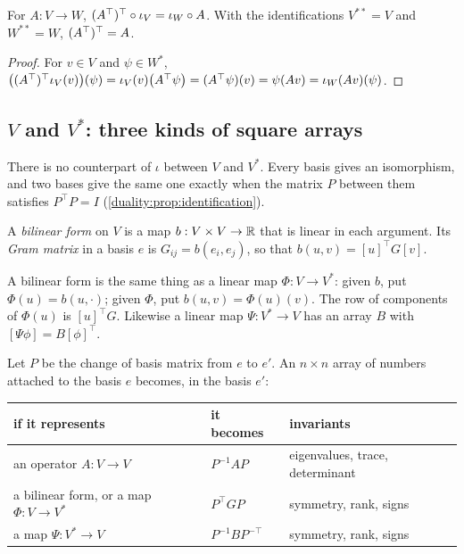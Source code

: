 \begin{notechapter}
\begin{proposition}
\label{duality:prop:double-dual}
For $A:V\to W$, $(A^{\top})^{\top}\circ\iota_V = \iota_W\circ A$. With the
identifications $V^{**} = V$ and $W^{**} = W$, $(A^{\top})^{\top} = A$.
\end{proposition}

\begin{proof}
For $v\in V$ and $\psi\in W^*$,
$\bigl((A^{\top})^{\top}\iota_V(v)\bigr)(\psi)
= \iota_V(v)\bigl(A^{\top}\psi\bigr) = (A^{\top}\psi)(v) = \psi(Av)
= \iota_W(Av)(\psi)$.
\end{proof}

\subsection{$V$ and $V^*$: three kinds of square arrays}

There is no counterpart of $\iota$ between $V$ and $V^*$. Every basis
gives an isomorphism, and two bases give the same one exactly when the
matrix $P$ between them satisfies $P^\top P = I$
(\cref{duality:prop:identification}).

\begin{definition}\label{duality:def:bilinear}
A \emph{bilinear form} on $V$ is a map $b:V\times V\to\mathbb{R}$ that is linear
in each argument. Its \emph{Gram matrix} in a basis $e$ is
$G_{ij} = b(e_i, e_j)$, so that $b(u, v) = [u]^\top G[v]$.
\end{definition}

A bilinear form is the same thing as a linear map $\Phi:V\to V^*$: given
$b$, put $\Phi(u) = b(u,\cdot)$; given $\Phi$, put
$b(u, v) = \Phi(u)(v)$. The row of components of $\Phi(u)$ is
$[u]^\top G$. Likewise a linear map $\Psi:V^*\to V$ has an array $B$ with
$[\Psi\phi] = B[\phi]^\top$.

\begin{proposition}\label{duality:prop:three}
Let $P$ be the change of basis matrix from $e$ to $e'$. An $n\times n$
array of numbers attached to the basis $e$ becomes, in the basis $e'$:
\begin{center}
\begin{tabular}{@{}lll@{}}
\toprule
if it represents & it becomes & invariants \\
\midrule
an operator $A:V\to V$ & $P^{-1}AP$ & eigenvalues, trace, determinant \\
a bilinear form, or a map $\Phi:V\to V^*$ & $P^\top GP$
  & symmetry, rank, signs \\
a map $\Psi:V^*\to V$ & $P^{-1}BP^{-\top}$ & symmetry, rank, signs \\
\bottomrule
\end{tabular}
\end{center}
\end{proposition}


\end{notechapter}

